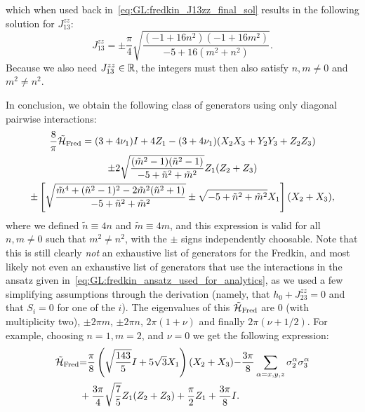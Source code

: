 which when used back in~\cref{eq:GL:fredkin_J13zz_final_sol} results in the following solution for $J_{13}^{zz}$:
\begin{equation}
    J_{13}^{zz} =
    \pm \frac{\pi}{4}
    \sqrt{\frac{
        (-1 + 16 n^2)(-1 + 16 m^2)
    }{
        -5 + 16 (m^2 + n^2)
    }}.
\end{equation}
Because we also need $J_{13}^{zz}\in{\mathbb{R}}$, the integers must then also satisfy  $n,m\neq0$ and $m^2\neq n^2$.

In conclusion, we obtain the following class of generators using only diagonal pairwise interactions:
\begin{equation}
\begin{gathered}
    \frac{8}{\pi}\tilde{{\mathcal{H}}}_{\operatorname{Fred}} =
    (3 + 4\nu_1) I + 4 Z_1
    - (3 + 4\nu_1) (X_2 X_3 + Y_2 Y_3 + Z_2 Z_3) \\
    \pm 2 \sqrt{\frac{
        (\tilde m^2-1)(\tilde n^2-1)
    }{
        -5 + \tilde n^2 + \tilde m^2
    }} Z_1 ( Z_2 + Z_3) \\
    \pm \left[
    \sqrt{\frac{
        \tilde m^4 + (\tilde n^2-1)^2 - 2 \tilde m^2(\tilde n^2+1)
    }{
        -5 + \tilde n^2 + \tilde m^2
    }}
    \pm \sqrt{-5 + \tilde n^2 + \tilde m^2} X_1
    \right] (X_2 + X_3),
\end{gathered}
\end{equation}
where we defined $\tilde n\equiv 4n$ and $\tilde m\equiv 4m$, and this expression is valid for all $n,m\neq0$ such that $m^2\neq n^2$, with the $\pm$ signs independently choosable.
Note that this is still clearly \emph{not} an exhaustive list of generators for the Fredkin, and most likely not even an exhaustive list of generators that use the interactions in the ansatz given in~\cref{eq:GL:fredkin_ansatz_used_for_analytics}, as we used a few simplifying assumptions through the derivation (namely, that $h_0+J_{23}^{zz}=0$ and that $S_i=0$ for one of the $i$).
The eigenvalues of this $\tilde{{\mathcal{H}}}_{\operatorname{Fred}}$ are $0$ (with multiplicity two), $\pm 2\pi m$, $\pm2\pi n$, $2\pi(1+\nu)$ and finally $2\pi(\nu+1/2)$.  
For example, choosing $n=1, m=2$, and $\nu=0$ we get the following expression:
\begin{align}
    \tilde{{\mathcal{H}}}_{\operatorname{Fred}} &{=} 
    \frac{\pi}{8} \left( \sqrt{\frac{143}{5}}I+5\sqrt 3 X_1\right)(X_2 + X_3) {-}\frac{3\pi}{8} \sum_{\alpha=x,y,z}\sigma^\alpha_2 \sigma^\alpha_3
    \nonumber\\
    &+
    \frac{3\pi}{4}\sqrt{\frac{7}{5}}Z_1(Z_2+Z_3) +\frac{\pi}{2}Z_1+\frac{3\pi}{8}I.
    \label{eq:GL:fredkin_generator}
\end{align}
